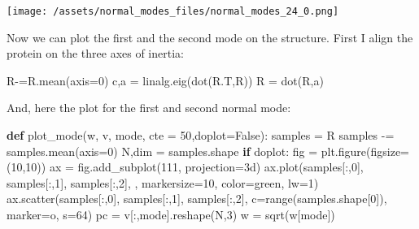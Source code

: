 \documentclass[
]{article}
\newenvironment{Shaded}{}{}
\newcommand{\BuiltInTok}[1]{\textcolor[rgb]{0.00,0.50,0.00}{#1}}
\newcommand{\ControlFlowTok}[1]{\textcolor[rgb]{0.00,0.44,0.13}{\textbf{#1}}}
\newcommand{\DecValTok}[1]{\textcolor[rgb]{0.25,0.63,0.44}{#1}}
\newcommand{\KeywordTok}[1]{\textcolor[rgb]{0.00,0.44,0.13}{\textbf{#1}}}
\newcommand{\NormalTok}[1]{#1}
\newcommand{\OperatorTok}[1]{\textcolor[rgb]{0.40,0.40,0.40}{#1}}
\newcommand{\StringTok}[1]{\textcolor[rgb]{0.25,0.44,0.63}{#1}}
\newcommand{\VariableTok}[1]{\textcolor[rgb]{0.10,0.09,0.49}{#1}}
\begin{document}
\texttt{[image: /assets/normal\_modes\_files/normal\_modes\_24\_0.png]}

Now we can plot the first and the second mode on the structure. First I
align the protein on the three axes of inertia:

\begin{Shaded}
\begin{Highlighting}[]
\NormalTok{R}\OperatorTok{{-}=}\NormalTok{R.mean(axis}\OperatorTok{=}\DecValTok{0}\NormalTok{)}
\NormalTok{c,a }\OperatorTok{=}\NormalTok{ linalg.eig(dot(R.T,R))}
\NormalTok{R }\OperatorTok{=}\NormalTok{ dot(R,a)}
\end{Highlighting}
\end{Shaded}

And, here the plot for the first and second normal mode:

\begin{Shaded}
\begin{Highlighting}[]
\KeywordTok{def}\NormalTok{ plot\_mode(w, v, mode, cte }\OperatorTok{=} \DecValTok{50}\NormalTok{,doplot}\OperatorTok{=}\VariableTok{False}\NormalTok{):}
\NormalTok{    samples }\OperatorTok{=}\NormalTok{ R}
\NormalTok{    samples }\OperatorTok{{-}=}\NormalTok{ samples.mean(axis}\OperatorTok{=}\DecValTok{0}\NormalTok{)}
\NormalTok{    N,dim }\OperatorTok{=}\NormalTok{ samples.shape}
    \ControlFlowTok{if}\NormalTok{ doplot:}
\NormalTok{        fig }\OperatorTok{=}\NormalTok{ plt.figure(figsize}\OperatorTok{=}\NormalTok{(}\DecValTok{10}\NormalTok{,}\DecValTok{10}\NormalTok{))}
\NormalTok{        ax }\OperatorTok{=}\NormalTok{ fig.add\_subplot(}\DecValTok{111}\NormalTok{, projection}\OperatorTok{=}\StringTok{\textquotesingle{}3d\textquotesingle{}}\NormalTok{)}
\NormalTok{        ax.plot(samples[:,}\DecValTok{0}\NormalTok{], samples[:,}\DecValTok{1}\NormalTok{], samples[:,}\DecValTok{2}\NormalTok{], }\StringTok{\textquotesingle{}{-}\textquotesingle{}}\NormalTok{, markersize}\OperatorTok{=}\DecValTok{10}\NormalTok{, color}\OperatorTok{=}\StringTok{\textquotesingle{}green\textquotesingle{}}\NormalTok{, lw}\OperatorTok{=}\DecValTok{1}\NormalTok{)}
\NormalTok{        ax.scatter(samples[:,}\DecValTok{0}\NormalTok{], samples[:,}\DecValTok{1}\NormalTok{], samples[:,}\DecValTok{2}\NormalTok{], c}\OperatorTok{=}\BuiltInTok{range}\NormalTok{(samples.shape[}\DecValTok{0}\NormalTok{]), marker}\OperatorTok{=}\StringTok{\textquotesingle{}o\textquotesingle{}}\NormalTok{, s}\OperatorTok{=}\DecValTok{64}\NormalTok{)}
\NormalTok{    pc }\OperatorTok{=}\NormalTok{ v[:,mode].reshape(N,}\DecValTok{3}\NormalTok{)}
\NormalTok{    w }\OperatorTok{=}\NormalTok{ sqrt(w[mode])}

\end{Highlighting}
\end{Shaded}
\end{document}
